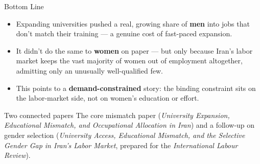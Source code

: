 \documentclass[aspectratio=169,11pt]{beamer}
\begin{document}
\begin{frame}{Bottom Line}
\begin{itemize}
\item Expanding universities pushed a real, growing share of \textbf{men} into jobs that don't match their training --- a genuine cost of fast-paced expansion.
\medskip
\item It didn't do the same to \textbf{women} on paper --- but only because Iran's labor market keeps the vast majority of women out of employment altogether, admitting only an unusually well-qualified few.
\medskip
\item This points to a \textbf{demand-constrained} story: the binding constraint sits on the labor-market side, not on women's education or effort.
\end{itemize}
\vspace{0.4cm}
\begin{block}{Two connected papers}
\small The core mismatch paper (\emph{University Expansion, Educational Mismatch, and Occupational Allocation in Iran}) and a follow-up on gender selection (\emph{University Access, Educational Mismatch, and the Selective Gender Gap in Iran's Labor Market}, prepared for the \emph{International Labour Review}).
\end{block}
\end{frame}
\end{document}

